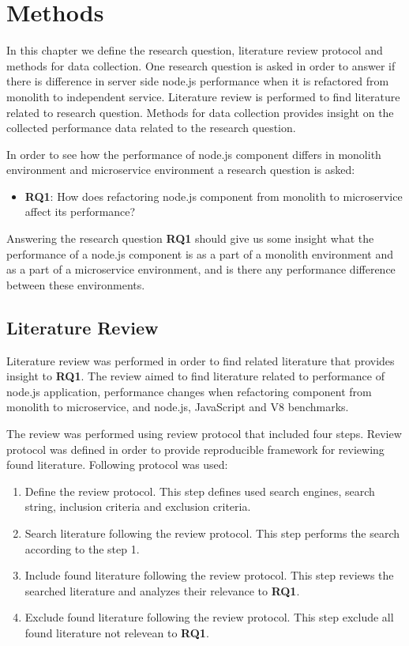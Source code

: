 \chapter{Methods\label{methods}}
In this chapter we define the research question, literature review protocol and methods for data collection.
One research question is asked in order to answer if there is difference in server side node.js performance when it is refactored from monolith to independent service.
Literature review is performed to find literature related to research question.
Methods for data collection provides insight on the collected performance data related to the research question.

In order to see how the performance of node.js component differs in monolith environment and microservice environment a research question is asked:
\begin{itemize}
    \item \textbf{RQ1}: How does refactoring node.js component from monolith to microservice affect its performance?
\end{itemize}

Answering the research question \textbf{RQ1} should give us some insight what the performance of a node.js component is as a part of a monolith environment and as a part of a microservice environment, and is there any performance difference between these environments.

\section{Literature Review}
Literature review was performed in order to find related literature that provides insight to \textbf{RQ1}.
The review aimed to find literature related to performance of node.js application, performance changes when refactoring component from monolith to microservice, and node.js, JavaScript and V8 benchmarks.

The review was performed using review protocol that included four steps.
Review protocol was defined in order to provide reproducible framework for reviewing found literature.
Following protocol was used:
\begin{enumerate}
    \item Define the review protocol. This step defines used search engines, search string, inclusion criteria and exclusion criteria.
    \item Search literature following the review protocol. This step performs the search according to the step 1.
    \item Include found literature following the review protocol. This step reviews the searched literature and analyzes their relevance to \textbf{RQ1}.
    \item Exclude found literature following the review protocol. This step exclude all found literature not relevean to \textbf{RQ1}.
\end{enumerate}

